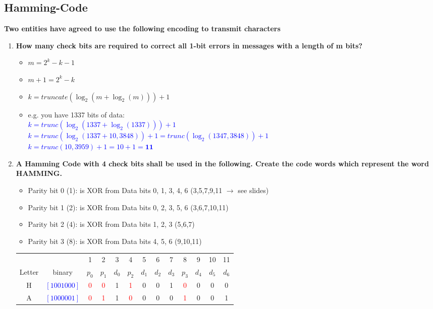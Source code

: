 \documentclass[a4paper,12pt]{article}
\begin{document}
	\subsection{Hamming-Code}
	\textbf{Two entities have agreed to use the following encoding to transmit characters}
	\begin{enumerate}[itemsep=0pt]
		\item \textbf{How many check bits are required to correct all 1-bit errors in messages with a length of m bits?}
		\begin{itemize}[itemsep=0pt]
			\item $m = 2^k - k - 1 $
			\item $m + 1 = 2^k - k $
			\item $k = truncate(\log_2(m+\log_2(m))) + 1$
			\item e.g. you have 1337 bits of data:\\
			\textcolor{blue}{ $k = trunc(\log_2(1337 + \log_2(1337))) + 1$\\
			$k = trunc(\log_2(1337 + 10,3848)) + 1 = trunc(\log_2(1347,3848)) + 1$\\
			$k = trunc(10,3959) + 1 = 10 + 1 = \textbf{11}$}
		\end{itemize}
		\item \textbf{A Hamming Code with 4 check bits shall be used in the following.  Create the code words which represent the word HAMMING.}
		\begin{itemize}[itemsep=0pt]	
			\item Parity bit 0 (1): is XOR from Data bits 0, 1, 3, 4, 6 (3,5,7,9,11 $\rightarrow$ see slides) 
			\item Parity bit 1 (2): is XOR from Data bits 0, 2, 3, 5, 6 (3,6,7,10,11) 
			\item Parity bit 2 (4): is XOR from Data bits 1, 2, 3 (5,6,7)
			\item Parity bit 3 (8): is XOR from Data bits 4, 5, 6 (9,10,11)
		\end{itemize}
		\begin{tabular}{c|c|ccccccccccc}
			~ & ~ & 1 & 2 & 3 & 4 & 5 & 6 & 7 & 8 & 9 & 10 & 11 \\
			Letter & binary & $p_0$ & $p_1$ & $d_0$ & $p_2$ & $d_1$ & $d_2$ & $d_3$ & $p_3$ & $d_4$ & $d_5$ & $d_6$ \\ \hline
			H & \textcolor{blue}{$[1001000]$} & \textcolor{red}{0} & \textcolor{red}{0} & 1 & \textcolor{red}{1} & 0 & 0 & 1 & \textcolor{red}{0} & 0 & 0 & 0 \\
			A & \textcolor{blue}{$[1000001]$} & \textcolor{red}{0} & \textcolor{red}{1} & 1 & \textcolor{red}{0} & 0 & 0 & 0 & \textcolor{red}{1} & 0 & 0 & 1 \\

\end{tabular}
\end{enumerate}
\end{document}
